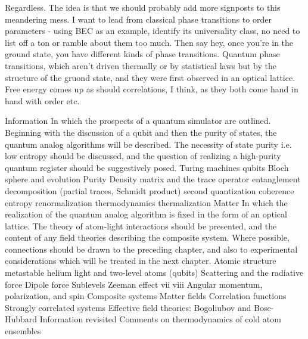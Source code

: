 Regardless.
	The idea is that we should probably add more signposts to
this meandering mess.
	I want to lead from classical phase transitions to
order parameters - using BEC as an example, identify its universality
class, no need to list off a ton or ramble about them too much.
	Then say
hey, once you're in the ground state, you have different kinds of phase
transitions.
	Quantum phase transitions, which aren't driven thermally or
by statistical laws but by the structure of the gruond state, and they
were first observed in an optical lattice.
	Free energy comes up as
should correlations, I think, as they both come hand in hand with order
etc.


Information In which the prospects of a quantum simulator are outlined.
	Beginning
with the discussion of a qubit and then the purity of states, the quantum analog
algorithms will be described.
	The necessity of state purity i.e.
	low entropy should
be discussed, and the question of realizing a high-purity quantum register should be
suggestively posed.
 Turing machines
 qubits
 Bloch sphere and evolution
 Purity
 Density matrix and the trace operator
 entanglement
 decomposition (partial traces, Schmidt product)
 second quantization
 coherence
 entropy
 renormalization
 thermodynamics
 thermalization
Matter In which the realization of the quantum analog algorithm is fixed in the form of
an optical lattice.
	The theory of atom-light interactions should be presented, and
the content of any field theories describing the composite system.
	Where possible,
connections should be drawn to the preceding chapter, and also to experimental
considerations which will be treated in the next chapter.
 Atomic structure
 metastable helium
 light and two-level atoms (qubits)
 Scattering and the radiative force
 Dipole force
 Sublevels
 Zeeman effect
vii
viii
 Angular momentum, polarization, and spin
 Composite systems
 Matter fields
 Correlation functions
 Strongly correlated systems
 Effective field theories: Bogoliubov and Bose-Hubbard
 Information revisited
 Comments on thermodynamics of cold atom ensembles
